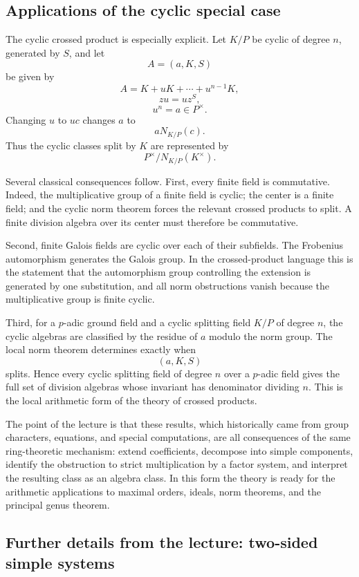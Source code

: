 \documentclass[12pt]{article}
\begin{document}
\subsection{Applications of the cyclic special case}

The cyclic crossed product is especially explicit. Let \(K/P\) be cyclic of degree \(n\), generated by \(S\), and let
\[
  A=(a,K,S)
\]
be given by
\[
  A=K+uK+
\cdots+u^{n-1}K,
\]
\[
  zu=uz^S,
\]
\[
  u^n=a\in P^{\times}.
\]
Changing \(u\) to \(uc\) changes \(a\) to
\[
  aN_{K/P}(c).
\]
Thus the cyclic classes split by \(K\) are represented by
\[
  P^{\times}/N_{K/P}(K^{\times}).
\]

Several classical consequences follow. First, every finite field is commutative. Indeed, the multiplicative group of a finite field is cyclic; the center is a finite field; and the cyclic norm theorem forces the relevant crossed products to split. A finite division algebra over its center must therefore be commutative.

Second, finite Galois fields are cyclic over each of their subfields. The Frobenius automorphism generates the Galois group. In the crossed-product language this is the statement that the automorphism group controlling the extension is generated by one substitution, and all norm obstructions vanish because the multiplicative group is finite cyclic.

Third, for a \(p\)-adic ground field and a cyclic splitting field \(K/P\) of degree \(n\), the cyclic algebras are classified by the residue of \(a\) modulo the norm group. The local norm theorem determines exactly when
\[
  (a,K,S)
\]
splits. Hence every cyclic splitting field of degree \(n\) over a \(p\)-adic field gives the full set of division algebras whose invariant has denominator dividing \(n\). This is the local arithmetic form of the theory of crossed products.

The point of the lecture is that these results, which historically came from group characters, equations, and special computations, are all consequences of the same ring-theoretic mechanism: extend coefficients, decompose into simple components, identify the obstruction to strict multiplication by a factor system, and interpret the resulting class as an algebra class. In this form the theory is ready for the arithmetic applications to maximal orders, ideals, norm theorems, and the principal genus theorem.



\subsection{Further details from the lecture: two-sided simple systems}
\end{document}
